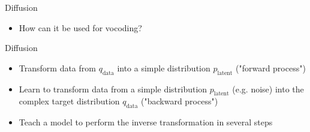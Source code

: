 \documentclass{beamer}
\begin{document}

\begin{frame}{Diffusion}
\large
    \begin{itemize}
        \setlength\itemsep{1.5em} 
        \item How can it be used for vocoding?
    \end{itemize}

\end{frame}    


\begin{frame}{Diffusion}

    \begin{itemize}
        \setlength\itemsep{1.5em}
        \item Transform data from $q_{\text{data}}$ into a simple distribution $p_{\text{latent}}$ ("forward process")
        \pause
        \item Learn to transform data from a simple distribution $p_{\text{latent}}$ (e.g. noise) into the complex target distribution $q_{\text{data}}$ ("backward process")
        \pause
        \item Teach a model to perform the inverse transformation in several steps
    \end{itemize}

\end{frame}






\end{document}
